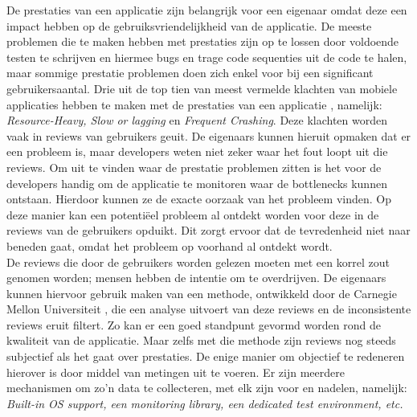 De prestaties van een applicatie zijn belangrijk voor een eigenaar omdat deze een impact hebben op de gebruiksvriendelijkheid van de applicatie. De meeste problemen die te maken hebben met prestaties zijn op te lossen door voldoende testen te schrijven en hiermee bugs en trage code sequenties uit de code te halen, maar sommige prestatie problemen doen zich enkel voor bij een significant gebruikersaantal. Drie uit de top tien van meest vermelde klachten van mobiele applicaties hebben te maken met de prestaties van een applicatie \cite{AppSucks}, namelijk: \textit{Resource-Heavy, Slow or lagging} en \textit{Frequent Crashing}. Deze klachten worden vaak in reviews van gebruikers geuit. De eigenaars kunnen hieruit opmaken dat er een probleem is, maar developers weten niet zeker waar het fout loopt uit die reviews. Om uit te vinden waar de prestatie problemen zitten is het voor de developers handig om de applicatie te monitoren waar de bottlenecks kunnen ontstaan. Hierdoor kunnen ze de exacte oorzaak van het probleem vinden. Op deze manier kan een potenti\"eel probleem al ontdekt worden voor deze in de reviews van de gebruikers opduikt. Dit zorgt ervoor dat de tevredenheid niet naar beneden gaat, omdat het probleem op voorhand al ontdekt wordt. \\



De reviews die door de gebruikers worden gelezen moeten met een korrel zout genomen worden; mensen hebben de intentie om te overdrijven. De eigenaars kunnen hiervoor gebruik maken van een methode, ontwikkeld door de Carnegie Mellon Universiteit \cite{fu2013people}, die een analyse uitvoert van deze reviews en de inconsistente reviews eruit filtert. Zo kan er een goed standpunt gevormd worden rond de kwaliteit van de applicatie. Maar zelfs met die methode zijn reviews nog steeds subjectief als het gaat over prestaties. De enige manier om objectief te redeneren hierover is door middel van metingen uit te voeren. Er zijn meerdere mechanismen om zo'n data te collecteren, met elk zijn voor en nadelen, namelijk: \textit{Built-in OS support, een monitoring library, een dedicated test environment, etc.}\\

